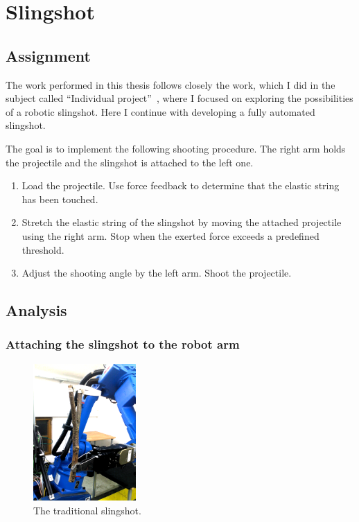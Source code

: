 \graphicspath{{Img/slingshot/}}

\chapter{Slingshot}

\section{Assignment}
The work performed in this thesis follows closely the work, which I did in the subject called ``Individual project''~\cite{PreDiplomaLejsekHlavac}, where I focused on exploring the possibilities of a robotic slingshot. Here I continue with developing a fully automated slingshot.
	
The goal is to implement the following shooting procedure. The right arm holds the projectile and the slingshot is attached to the left one.
%
		\begin{enumerate}\itemsep0pt
		    \item Load the projectile. Use force feedback to determine that the elastic string has been touched.
		    \item Stretch the elastic string of the slingshot by moving the attached projectile using the right arm. Stop when the exerted force exceeds a predefined threshold.
		    \item Adjust the shooting angle by the left arm. Shoot the projectile.
		\end{enumerate}	


\section{Analysis}

\subsection{Attaching the slingshot to the robot arm}		

\begin{figure}[h]
\includegraphics[width=0.35\textwidth]{slingshot_traditionalAdj.png}
\centering
\caption{The traditional slingshot.}
\label{fig:traditional slingshot}
\end{figure}	

